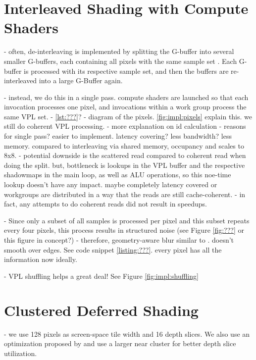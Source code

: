 
\section{Interleaved Shading with Compute Shaders}
\label{sec:impl:interleavedShading}
- often, de-interleaving is implemented by splitting the G-buffer into several smaller G-buffers, each containing all pixels with the same sample set \cite{segovia2006non}. Each G-buffer is processed with its respective sample set, and then the buffers are re-interleaved into a large G-Buffer again.

- instead, we do this in a single pass. compute shaders are launched so that each invocation processes one pixel, and invocations within a work group process the same VPL set.
- \ref{lst:???}?
- diagram of the pixels. \ref{fig:impl:pixels} explain this. we still do coherent VPL processing.
- more explanation on id calculation
- reasons for single pass? easier to implement. latency covering? less bandwidth? less memory. compared to interleaving via shared memory, occupancy and scales to 8x8.
- potential downside is the scattered read compared to coherent read when doing the split. but, bottleneck is lookups in the VPL buffer and the respective shadowmaps in the main loop, as well as ALU operations, so this noe-time lookup doesn't have any impact. maybe completely latency covered or workgroups are distributed in a way that the reads are still cache-coherent.
- in fact, any attempts to do coherent reads did not result in speedups.

- Since only a subset of all samples is processed per pixel and this subset repeats every four pixels, this process results in structured noise (see Figure \ref{fig:???} or this figure in concept?)
- therefore, geometry-aware blur similar to \citet{laine2007incremental}. doesn't smooth over edges. See code snippet \ref{listing:???}. every pixel has all the information now ideally.

- VPL shuffling helps a great deal! See Figure \ref{fig:impl:shuffling}

\section{Clustered Deferred Shading}
\label{sec:impl:clusteredShading}


- we use 128 pixels as screen-space tile width and 16 depth slices. We also use an optimization proposed by \citet{persson::2013::practical} and use a larger near cluster for better depth slice utilization.

